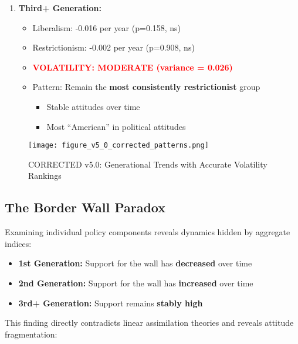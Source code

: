 \documentclass[11pt,letterpaper]{article}
\begin{document}
\begin{enumerate}
    \item \textbf{Third+ Generation:}
        \begin{itemize}
            \item Liberalism: -0.016 per year (p=0.158, ns)
            \item Restrictionism: -0.002 per year (p=0.908, ns)
            \item \textcolor{red}{\textbf{VOLATILITY: MODERATE (variance = 0.026)}}
            \item Pattern: Remain the \textbf{most consistently restrictionist} group
                \begin{itemize}
                    \item Stable attitudes over time
                    \item Most ``American'' in political attitudes
                \end{itemize}
        \end{itemize}
\end{enumerate}

\begin{figure}[H]
    \centering
    \texttt{[image: figure\_v5\_0\_corrected\_patterns.png]}
    \caption{CORRECTED v5.0: Generational Trends with Accurate Volatility Rankings}
    \label{fig:main_trends}
\end{figure}

\subsection{The Border Wall Paradox}

Examining individual policy components reveals dynamics hidden by aggregate indices:

\begin{itemize}
    \item \textbf{1st Generation:} Support for the wall has \textbf{decreased} over time
    \item \textbf{2nd Generation:} Support for the wall has \textbf{increased} over time
    \item \textbf{3rd+ Generation:} Support remains \textbf{stably high}
\end{itemize}

This finding directly contradicts linear assimilation theories and reveals attitude fragmentation:
\end{document}
